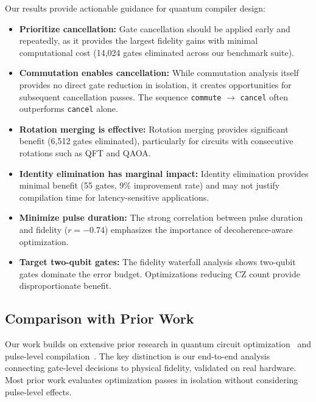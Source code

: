 \documentclass[journal]{IEEEtran}
\begin{document}
Our results provide actionable guidance for quantum compiler design:

\begin{itemize}
    \item \textbf{Prioritize cancellation:} Gate cancellation should be applied early and repeatedly, as it provides the largest fidelity gains with minimal computational cost (14,024 gates eliminated across our benchmark suite).
    
    \item \textbf{Commutation enables cancellation:} While commutation analysis itself provides no direct gate reduction in isolation, it creates opportunities for subsequent cancellation passes. The sequence \texttt{commute} $\rightarrow$ \texttt{cancel} often outperforms \texttt{cancel} alone.
    
    \item \textbf{Rotation merging is effective:} Rotation merging provides significant benefit (6,512 gates eliminated), particularly for circuits with consecutive rotations such as QFT and QAOA.
    
    \item \textbf{Identity elimination has marginal impact:} Identity elimination provides minimal benefit (55 gates, 9\% improvement rate) and may not justify compilation time for latency-sensitive applications.
    
    \item \textbf{Minimize pulse duration:} The strong correlation between pulse duration and fidelity ($r = -0.74$) emphasizes the importance of decoherence-aware optimization.
    
    \item \textbf{Target two-qubit gates:} The fidelity waterfall analysis shows two-qubit gates dominate the error budget. Optimizations reducing CZ count provide disproportionate benefit.
\end{itemize}

\subsection{Comparison with Prior Work}

Our work builds on extensive prior research in quantum circuit optimization~\cite{nam2018automated, kissinger2020reducing} and pulse-level compilation~\cite{shi2019optimized}. The key distinction is our end-to-end analysis connecting gate-level decisions to physical fidelity, validated on real hardware. Most prior work evaluates optimization passes in isolation without considering pulse-level effects.
\end{document}
